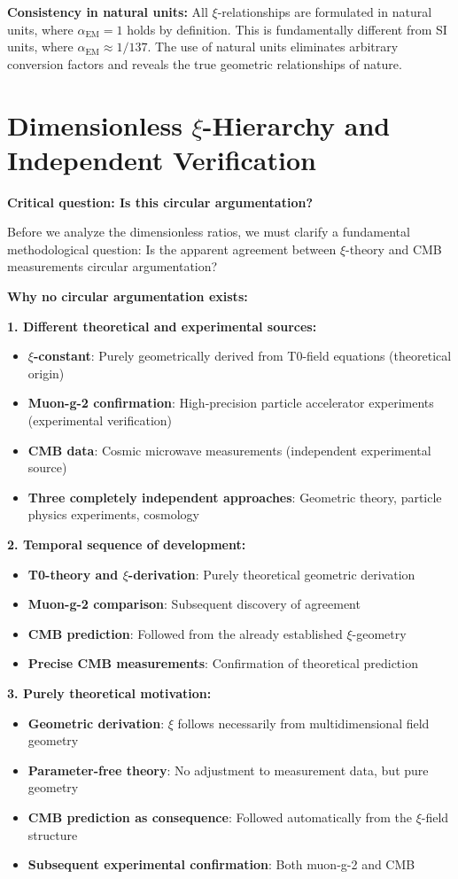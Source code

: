 \documentclass[12pt,a4paper]{article}
\begin{document}
	\textbf{Consistency in natural units:}
	All $\xi$-relationships are formulated in natural units, where $\alpha_{\text{EM}} = 1$ holds by definition. This is fundamentally different from SI units, where $\alpha_{\text{EM}} \approx 1/137$. The use of natural units eliminates arbitrary conversion factors and reveals the true geometric relationships of nature.
	
	\section{Dimensionless $\xi$-Hierarchy and Independent Verification}
	
	\textbf{Critical question: Is this circular argumentation?}
	
	Before we analyze the dimensionless ratios, we must clarify a fundamental methodological question: Is the apparent agreement between $\xi$-theory and CMB measurements circular argumentation?
	
	\textbf{Why no circular argumentation exists:}
	
	\textbf{1. Different theoretical and experimental sources:}
	\begin{itemize}
		\item \textbf{$\xi$-constant}: Purely geometrically derived from T0-field equations (theoretical origin)
		\item \textbf{Muon-g-2 confirmation}: High-precision particle accelerator experiments (experimental verification)
		\item \textbf{CMB data}: Cosmic microwave measurements (independent experimental source)
		\item \textbf{Three completely independent approaches}: Geometric theory, particle physics experiments, cosmology
	\end{itemize}
	
	\textbf{2. Temporal sequence of development:}
	\begin{itemize}
		\item \textbf{T0-theory and $\xi$-derivation}: Purely theoretical geometric derivation
		\item \textbf{Muon-g-2 comparison}: Subsequent discovery of agreement 
		\item \textbf{CMB prediction}: Followed from the already established $\xi$-geometry
		\item \textbf{Precise CMB measurements}: Confirmation of theoretical prediction
	\end{itemize}
	
	\textbf{3. Purely theoretical motivation:}
	\begin{itemize}
		\item \textbf{Geometric derivation}: $\xi$ follows necessarily from multidimensional field geometry
		\item \textbf{Parameter-free theory}: No adjustment to measurement data, but pure geometry
		\item \textbf{CMB prediction as consequence}: Followed automatically from the $\xi$-field structure
		\item \textbf{Subsequent experimental confirmation}: Both muon-g-2 and CMB
	\end{itemize}
	
\end{document}
